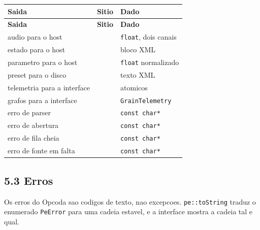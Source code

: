 \documentclass[11pt,a4paper,landscape]{article}
\begin{document}
\begin{longtable}{@{}L{6.4cm}L{8.6cm}L{10.0cm}@{}}
\toprule
{}
\textbf{Saida} & \textbf{Sitio} & \textbf{Dado} \\
\midrule
\endfirsthead
\toprule
{}
\textbf{Saida} & \textbf{Sitio} & \textbf{Dado} \\
\midrule
\endhead
audio para o host &  & \texttt{float}, dois canais \\
estado para o host &  & bloco XML \\
parametro para o host &  & \texttt{float} normalizado \\
preset para o disco &  & texto XML \\
telemetria para a interface &  & atomicos \\
grafos para a interface &  & \texttt{GrainTelemetry} \\
erro de parser &  & \texttt{const char*} \\
erro de abertura &  & \texttt{const char*} \\
erro de fila cheia &  & \texttt{const char*} \\
erro de fonte em falta &  & \texttt{const char*} \\
\bottomrule
\end{longtable}

\subsection*{5.3 Erros}

Os erros do Opcoda sao codigos de texto, nao excepcoes.
\texttt{pe::toString} traduz o enumerado \texttt{PeError} para uma cadeia
estavel, e a interface mostra a cadeia tal e qual.
\end{document}
